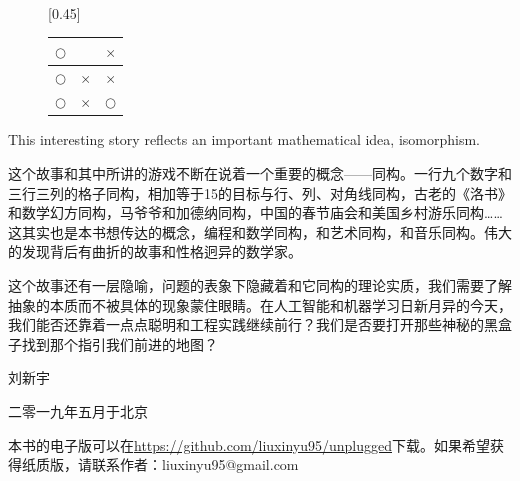 \documentclass[UTF8]{article}
\begin{document}
\begin{figure}[htbp]
{\begin{tabular}{c|c|c}
   \end{tabular}
   \vspace{3mm}
 } \vspace{3mm} \\
 [0.45\linewidth]{
   \begin{tabular}{c|c|c}
   $\pmb{\bigcirc}$ &  & $\times$\\
   \hline
   $\pmb{\bigcirc}$ &  $\times$ & $\times$ \\
   \hline
   $\pmb{\bigcirc}$ & $\times$ & $\bigcirc$ \\
   \end{tabular}
   \vspace{3mm}
 }
 \captionsetup{labelformat=empty}
 \caption{}
 \label{fig:game-steps}
\end{figure}

This interesting story reflects an important mathematical idea, isomorphism.

这个故事和其中所讲的游戏不断在说着一个重要的概念——同构。一行九个数字和三行三列的格子同构，相加等于15的目标与行、列、对角线同构，古老的《洛书》和数学幻方同构，马爷爷和加德纳同构，中国的春节庙会和美国乡村游乐同构……这其实也是本书想传达的概念，编程和数学同构，和艺术同构，和音乐同构。伟大的发现背后有曲折的故事和性格迥异的数学家。

这个故事还有一层隐喻，问题的表象下隐藏着和它同构的理论实质，我们需要了解抽象的本质而不被具体的现象蒙住眼睛。在人工智能和机器学习日新月异的今天，我们能否还靠着一点点聪明和工程实践继续前行？我们是否要打开那些神秘的黑盒子找到那个指引我们前进的地图？

\vspace{15mm}

刘新宇

二零一九年五月于北京

\begin{Exercise}
\end{Exercise}

\vspace{10mm}

本书的电子版可以在\url{https://github.com/liuxinyu95/unplugged}下载。如果希望获得纸质版，请联系作者：liuxinyu95@gmail.com

\ifx\wholebook\relax \else

\expandafter\enddocument

\fi
\end{document}
